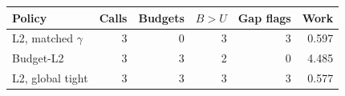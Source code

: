\begin{tabular}{lrrrrr}
\toprule
Policy & Calls & Budgets & $B>U$ & Gap flags & Work\\
\midrule
L2, matched $\gamma$ & 3 & 0 & 3 & 3 & 0.597\\
Budget-L2 & 3 & 3 & 2 & 0 & 4.485\\
L2, global tight & 3 & 3 & 3 & 3 & 0.577\\
\bottomrule
\end{tabular}
